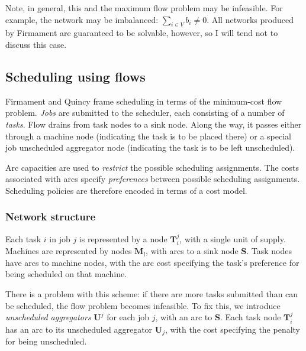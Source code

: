 Note, in general, this and the maximum flow problem may be infeasible. For example, the network may be imbalanced: $\sum_{i\in V}b_{i}\neq0$. All networks produced by Firmament are guaranteed to be solvable, however, so I will tend not to discuss this case\footnotemark.

\subsection{Scheduling using flows} \label{sec:prep-flow-scheduling}

Firmament and Quincy frame scheduling in terms of the minimum-cost flow problem. \emph{Jobs} are submitted to the scheduler, each consisting of a number of \emph{tasks}. Flow drains from task nodes to a sink node. Along the way, it passes either through a machine node (indicating the task is to be placed there) or a special job unscheduled aggregator node (indicating the task is to be left unscheduled).

Arc capacities are used to \emph{restrict} the possible scheduling assignments. The costs associated with arcs specify \emph{preferences} between possible scheduling assignments. Scheduling policies are therefore encoded in terms of a cost model.

\subsubsection{Network structure}



Each task $i$ in job $j$ is represented by a node $\mathbf{T}_i^j$, with a single unit of supply. Machines are represented by nodes $\mathbf{M}_l$, with arcs to a sink node $\mathbf{S}$. Task nodes have arcs to machine nodes, with the arc cost specifying the task's preference for being scheduled on that machine.

There is a problem with this scheme: if there are more tasks submitted than can be scheduled, the flow problem becomes infeasible. To fix this, we introduce \emph{unscheduled aggregators} $\mathbf{U}^j$ for each job $j$, with an arc to $\mathbf{S}$. Each task node $\mathbf{T}_i^j$ has an arc to its unscheduled aggregator $\mathbf{U}_j$, with the cost specifying the penalty for being unscheduled.

